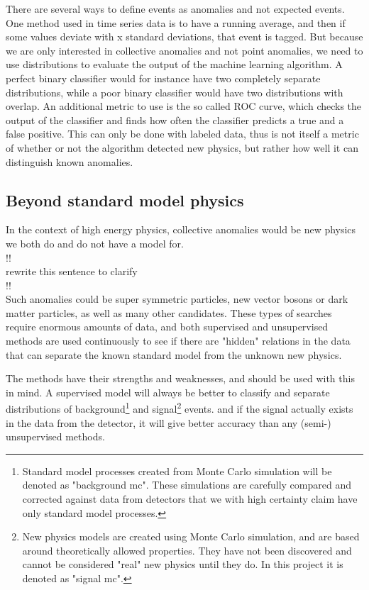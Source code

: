 \documentclass[ reprint, amsmath,amssymb, aps, nofootinbib]{revtex4-2}
\begin{document}
There are several ways to define events as anomalies and not expected events. One method used in time series data is to have a running average, and then if some values deviate with x standard deviations, that event is tagged. But because we are only interested in collective anomalies and not point anomalies, we need to use distributions to evaluate the output of the machine learning algorithm. A perfect binary classifier would for instance have two completely separate distributions, while a poor binary classifier would have two distributions with overlap. An additional metric to use is the so called ROC curve, which checks the output of the classifier and finds how often the classifier predicts a true and a false positive. This can only be done with labeled data, thus is not itself a metric of whether or not the algorithm detected new physics, but rather how well it can distinguish known anomalies.

\subsection{Beyond standard model physics}



In the context of high energy physics, collective anomalies would be new physics we both do and do not have a model for.
\\!!\\
rewrite this sentence to clarify 
\\!!\\
Such anomalies could be super symmetric particles\cite{JMLR:v18:16-558}, new vector bosons or dark matter particles, as well as many other candidates. These types of searches require enormous amounts of data, and both supervised and unsupervised methods are used continuously to see if there are "hidden" relations in the data that can separate the known standard model from the unknown new physics. \par 

The methods have their strengths and weaknesses, and should be used with this in mind. A supervised model will always be better to classify and separate distributions of background\footnote{Standard model processes created from Monte Carlo simulation will be denoted as "background mc". These simulations are carefully compared and corrected against data from detectors that we with high certainty claim have only standard model processes.} and signal\footnote{New physics models are created using Monte Carlo simulation, and are based around theoretically allowed properties. They have not been discovered and cannot be considered "real" new physics until they do. In this project it is denoted as "signal mc".} events. and if the signal actually exists in the data from the detector, it will give better accuracy than any (semi-) unsupervised methods. \par 
\end{document}
